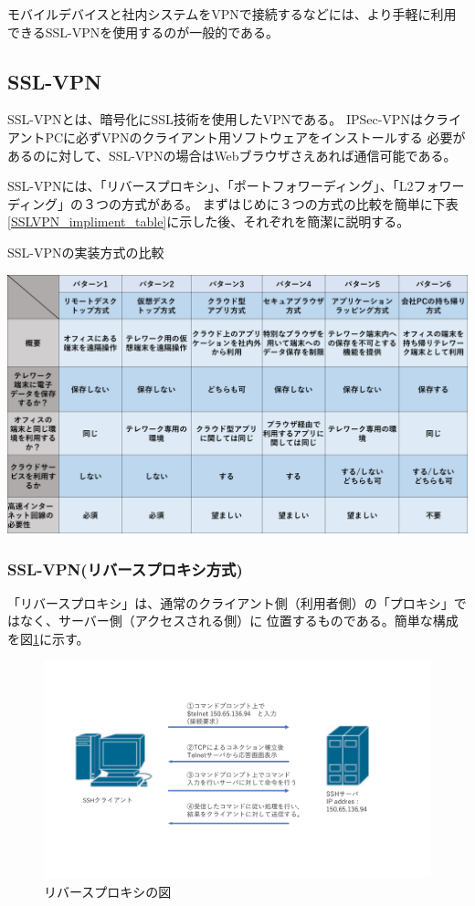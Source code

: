 \documentclass[11pt,a4j,titlepage]{jreport}
\begin{document}
モバイルデバイスと社内システムをVPNで接続するなどには、より手軽に利用できるSSL-VPNを使用するのが一般的である。


\subsection{SSL-VPN}
SSL-VPNとは、暗号化にSSL技術を使用したVPNである。
IPSec-VPNはクライアントPCに必ずVPNのクライアント用ソフトウェアをインストールする
必要があるのに対して、SSL-VPNの場合はWebブラウザさえあれば通信可能である。

SSL-VPNには、「リバースプロキシ」、「ポートフォワーディング」、「L2フォワーディング」の３つの方式がある。
まずはじめに３つの方式の比較を簡単に下表\ref{SSLVPN_impliment_table}に示した後、それぞれを簡潔に説明する。

\begin{table}[tbp]
    \centering
    \caption{SSL-VPNの実装方式の比較}
    \includegraphics[width=1.0\textwidth, page=3]{graphs/telework_list.pdf}
    \label{SSLVPN_impliment_table}
\end{table}

\subsubsection*{SSL-VPN(リバースプロキシ方式)}

「リバースプロキシ」は、通常のクライアント側（利用者側）の「プロキシ」ではなく、サーバー側（アクセスされる側）に
位置するものである。簡単な構成を図\ref{reverse_proxy}に示す。

\begin{figure}[tbp]
    \centering
    \includegraphics[width=1.0\textwidth, page=16]{graphs/network_archtecture.pdf}
    \caption{リバースプロキシの図}
    \label{reverse_proxy}
\end{figure}
\end{document}
